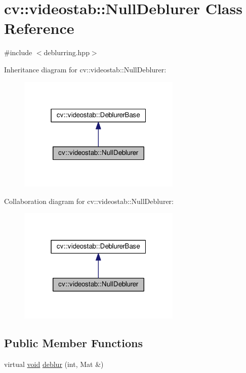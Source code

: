 \hypertarget{classcv_1_1videostab_1_1NullDeblurer}{\section{cv\-:\-:videostab\-:\-:Null\-Deblurer Class Reference}
\label{classcv_1_1videostab_1_1NullDeblurer}
}


{\ttfamily \#include $<$deblurring.\-hpp$>$}



Inheritance diagram for cv\-:\-:videostab\-:\-:Null\-Deblurer\-:\nopagebreak
\begin{figure}[H]
\begin{center}
\leavevmode
\includegraphics[width=220pt]{classcv_1_1videostab_1_1NullDeblurer__inherit__graph}
\end{center}
\end{figure}


Collaboration diagram for cv\-:\-:videostab\-:\-:Null\-Deblurer\-:\nopagebreak
\begin{figure}[H]
\begin{center}
\leavevmode
\includegraphics[width=220pt]{classcv_1_1videostab_1_1NullDeblurer__coll__graph}
\end{center}
\end{figure}
\subsection*{Public Member Functions}
\begin{DoxyCompactItemize}
\item 
virtual \hyperlink{legacy_8hpp_a8bb47f092d473522721002c86c13b94e}{void} \hyperlink{classcv_1_1videostab_1_1NullDeblurer_a1268c141fbe0d4de2554b4ef1d39d124}{deblur} (int, Mat \&)
\end{DoxyCompactItemize}
